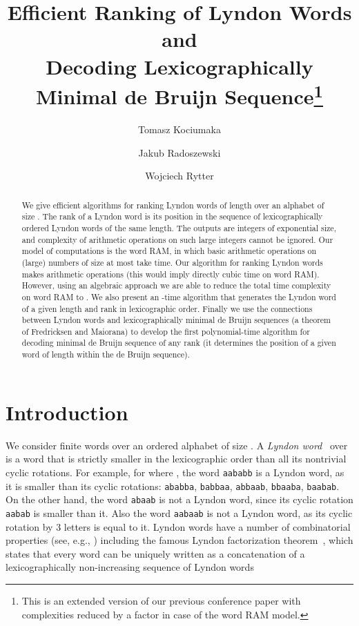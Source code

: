 \documentclass{article}
\author{Tomasz Kociumaka}
\author{Jakub Radoszewski}
\author{Wojciech Rytter}
\affil{Institute of Informatics, University of Warsaw, Poland}
\affil[]{\texttt{[kociumaka,jrad,rytter]@mimuw.edu.pl}}
\date{\vspace{-1cm}}
\title{
Efficient Ranking of Lyndon Words and\\ Decoding
Lexicographically Minimal de Bruijn Sequence\footnote{
This is an extended version of our previous conference paper \cite{DBLP:conf/cpm/KociumakaRR14} with complexities reduced
by a  factor in case of the word RAM model.
}
   }
\theoremstyle{definition}
\theoremstyle{remark}
\begin{document}
\maketitle
\begin{abstract}
We give efficient algorithms for ranking Lyndon words of length  over
an alphabet of size . The rank of a Lyndon word is its position
in the sequence of lexicographically ordered Lyndon words of the same length.
The outputs are integers of exponential size, and
complexity of arithmetic operations on such large integers cannot be ignored.
Our model of computations is the word RAM, in which  basic arithmetic operations on
(large) numbers of size at most  take  time.
Our algorithm for ranking Lyndon words makes  arithmetic operations
(this would imply directly cubic time on word RAM).
However, using an algebraic approach we
are able to reduce the total time complexity on word RAM to .
We also present an -time algorithm that generates the Lyndon
word of a given length and rank in lexicographic order.
Finally we use the connections between Lyndon words and lexicographically minimal de Bruijn sequences
(a theorem of Fredricksen and Maiorana) to develop the first polynomial-time algorithm
for decoding minimal de Bruijn sequence of any rank 
(it determines the position of a given word of length  within the de Bruijn sequence).
\end{abstract}


\section{Introduction}
We consider finite words over an ordered alphabet  of size .
A \emph{Lyndon word}~\cite{Lyndon1954,chen1958free} over  is a word that is strictly smaller in the lexicographic order than all its
nontrivial cyclic rotations.
For example, for  where , the word \texttt{aababb} is a Lyndon word,
as it is smaller than its cyclic rotations: \texttt{ababba}, \texttt{babbaa}, \texttt{abbaab},
\texttt{bbaaba}, \texttt{baabab}.
On the other hand, the word \texttt{abaab} is not a Lyndon word, since its cyclic rotation \texttt{aabab}
is smaller than it.
Also the word \texttt{aabaab} is not a Lyndon word, as its cyclic rotation by 3 letters is equal to it.
Lyndon words have a number of combinatorial properties (see, e.g., \cite{Lothaire}) including the famous Lyndon
factorization theorem~\cite{chen1958free}, which states that every word can be uniquely written
as a concatenation of a lexicographically non-increasing sequence of Lyndon words
\end{document}
